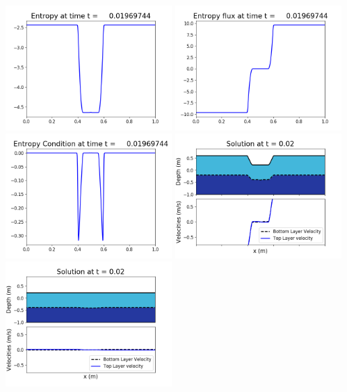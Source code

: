 \documentclass[11pt]{article}
\begin{document}
\vskip 10pt 
\includegraphics[width=0.475\textwidth]{frame0055fig1007.png}
\includegraphics[width=0.475\textwidth]{frame0055fig1008.png}
\vskip 10pt 
\includegraphics[width=0.475\textwidth]{frame0055fig1009.png}
\vskip 10pt 
\includegraphics[width=0.475\textwidth]{frame0056fig1001.png}
\includegraphics[width=0.475\textwidth]{frame0056fig1002.png}
\end{document}
